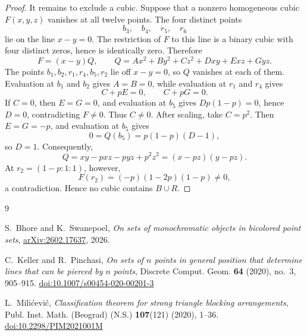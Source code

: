 \documentclass[11pt]{amsart}
\begin{document}
\begin{proof}
It remains to exclude a cubic. Suppose that a nonzero homogeneous
cubic $F(x,y,z)$ vanishes at all twelve points. The four distinct points
\[
 b_3,\quad b_4,\quad r_5,\quad r_6
\]
lie on the line $x-y=0$. The restriction of $F$ to this line is a
binary cubic with four distinct zeros, hence is identically zero.
Therefore
\[
 F=(x-y)Q,
 \qquad
 Q=Ax^2+By^2+Cz^2+Dxy+Exz+Gyz.
\]
The points $b_1,b_2,r_1,r_4,b_5,r_2$ lie off $x-y=0$, so $Q$ vanishes
at each of them. Evaluation at $b_1$ and $b_2$ gives $A=B=0$, while
evaluation at $r_1$ and $r_4$ gives
\[
 C+pE=0,
 \qquad
 C+pG=0.
\]
If $C=0$, then $E=G=0$, and evaluation at $b_5$ gives
$Dp(1-p)=0$, hence $D=0$, contradicting $F\neq0$. Thus $C\neq0$.
After scaling, take $C=p^2$. Then $E=G=-p$, and evaluation at $b_5$
gives
\[
 0=Q(b_5)=p(1-p)(D-1),
\]
so $D=1$. Consequently,
\[
 Q=xy-pxz-pyz+p^2z^2=(x-pz)(y-pz).
\]
At $r_2=(1-p:1:1)$, however,
\[
 F(r_2)=(-p)(1-2p)(1-p)\neq0,
\]
a contradiction. Hence no cubic contains $B\cup R$.
\end{proof}

\begin{thebibliography}{9}

S.~Bhore and K.~Swanepoel,
\emph{On sets of monochromatic objects in bicolored point sets},
\href{https://arxiv.org/abs/2602.17637}{arXiv:2602.17637}, 2026.

C.~Keller and R.~Pinchasi,
\emph{On sets of $n$ points in general position that determine lines
that can be pierced by $n$ points},
Discrete Comput. Geom. \textbf{64} (2020), no.~3, 905--915.
\href{https://doi.org/10.1007/s00454-020-00201-3}
{doi:10.1007/s00454-020-00201-3}

L.~Mili\'cevi\'c,
\emph{Classification theorem for strong triangle blocking arrangements},
Publ. Inst. Math. (Beograd) (N.S.) \textbf{107}(121) (2020), 1--36.
\href{https://doi.org/10.2298/PIM2021001M}
{doi:10.2298/PIM2021001M}

\end{thebibliography}
\end{document}

